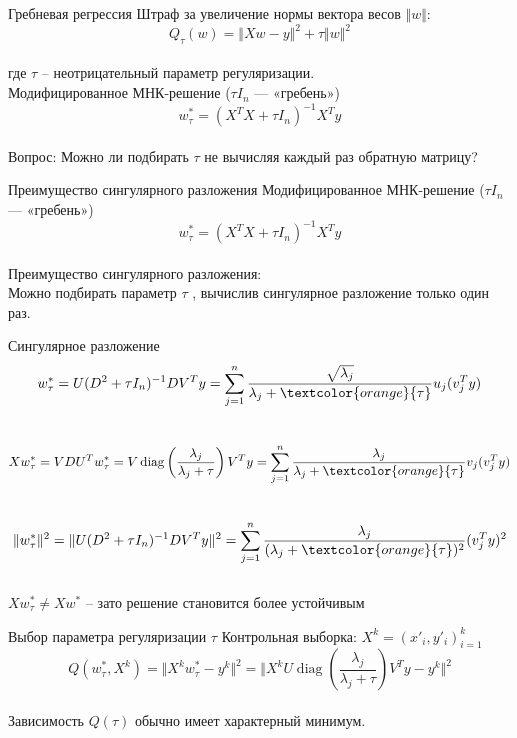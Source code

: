 \documentclass[10pt]{beamer}
\begin{document}
{
\begin{frame}{Гребневая регрессия}
	Штраф за увеличение нормы вектора весов $\Vert w \Vert$:\\
	$$Q_{\tau} (w) = \Vert X w - y \Vert^2 + \tau \Vert w \Vert^2$$\\
	где $\tau$ -- неотрицательный параметр регуляризации.\\
  \pause
	\bigbreak
	Модифицированное МНК-решение ($\tau I_n$ — «гребень»)\\
	$$w^*_{\tau} = (X^T X + \tau I_n)^{-1}X^Ty$$\\
  \pause	
  \bigbreak
	\alert{Вопрос:} Можно ли подбирать $\tau$ не вычисляя каждый раз обратную матрицу?
\end{frame}
}

\begin{frame}{Преимущество сингулярного разложения}
	Модифицированное МНК-решение ($\tau I_n$ — «гребень»)\\
	$$w^*_{\tau} = (X^TX + \tau I_n)^{-1}X^Ty$$\\
	\pause
	\bigbreak
	Преимущество сингулярного разложения:\\
	Можно подбирать параметр $\tau$ , вычислив сингулярное разложение только один раз.
\end{frame}

\begin{frame}{Сингулярное разложение}
	$$w_{\tau}^*= U(D^2 + \tau I_n)^{-1}DV^Ty = \sum\limits_{j=1}^n \frac{\sqrt{\lambda_j}}{\lambda_j + \textcolor{orange}{\tau}} u_j(v_j^Ty)$$\\
	\pause
	$$Xw_{\tau}^* = VDU^Tw_{\tau}^* = V \operatorname{diag} \left(\frac{\lambda_j}{\lambda_j + \tau}\right) V^Ty = \sum\limits_{j=1}^n \frac{\lambda_j}{\lambda_j + \textcolor{orange}{\tau}} v_j (v_j^Ty)$$\\
	\pause
	$$\Vert w_{\tau}^* \Vert^2 = \Vert U (D^2 + \tau I_n)^{-1} DV^T y \Vert^2 = \sum\limits_{j=1}^n \frac{\lambda_j}{(\lambda_j + \textcolor{orange}{\tau})^2} (v^T_j y)^2$$\\
	\pause
	$X w_{\tau}^* \neq Xw^*$ -- зато решение становится более устойчивым
\end{frame}

\begin{frame}{Выбор параметра регуляризации $\tau$}
	Контрольная выборка: $X^k = (x'_i, y'_i)_{i=1}^k$\\
	$$Q(w_{\tau}^*,X^k) = \Vert X^k w_{\tau}^* - y^k \Vert^2 = \Vert X^kU \operatorname{diag} \left(\frac{\lambda_j}{\lambda_j + \tau}\right) V^T y -y^k \Vert^2$$\\
	\bigbreak
	\pause
	Зависимость $Q(\tau)$ обычно имеет характерный минимум.
\end{frame}
\end{document}
